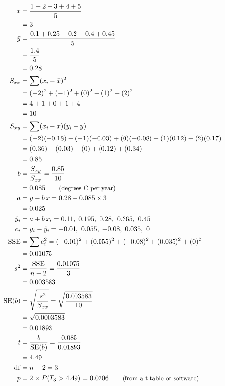 \begin{align*}
\bar{x} &= \frac{1 + 2 + 3 + 4 + 5}{5} \\
 &= 3 \\
\bar{y} &= \frac{0.1 + 0.25 + 0.2 + 0.4 + 0.45}{5} \\
 &= \frac{1.4}{5} \\
 &= 0.28 \\
S_{xx} &= \sum (x_i - \bar{x})^2 \\
 &= (-2)^2 + (-1)^2 + (0)^2 + (1)^2 + (2)^2 \\
 &= 4 + 1 + 0 + 1 + 4 \\
 &= 10 \\
S_{xy} &= \sum (x_i - \bar{x})(y_i - \bar{y}) \\
 &= (-2)(-0.18) + (-1)(-0.03) + (0)(-0.08) + (1)(0.12) + (2)(0.17) \\
 &= (0.36) + (0.03) + (0) + (0.12) + (0.34) \\
 &= 0.85 \\
b &= \frac{S_{xy}}{S_{xx}} = \frac{0.85}{10} \\
 &= 0.085 \qquad \text{\small (degrees C per year)} \\
a &= \bar{y} - b\,\bar{x} = 0.28 - 0.085 \times 3 \\
 &= 0.025 \\
\hat{y}_i &= a + b\,x_i = 0.11,\ 0.195,\ 0.28,\ 0.365,\ 0.45 \\
e_i &= y_i - \hat{y}_i = -0.01,\ 0.055,\ -0.08,\ 0.035,\ 0 \\
\mathrm{SSE} &= \sum e_i^2 = (-0.01)^2 + (0.055)^2 + (-0.08)^2 + (0.035)^2 + (0)^2 \\
 &= 0.01075 \\
s^2 &= \frac{\mathrm{SSE}}{n - 2} = \frac{0.01075}{3} \\
 &= 0.003583 \\
\mathrm{SE}(b) &= \sqrt{\frac{s^2}{S_{xx}}} = \sqrt{\frac{0.003583}{10}} \\
 &= \sqrt{0.0003583} \\
 &= 0.01893 \\
t &= \frac{b}{\mathrm{SE}(b)} = \frac{0.085}{0.01893} \\
 &= 4.49 \\
\mathrm{df} &= n - 2 = 3 \\
p &= 2 \times P(T_3 > 4.49) = 0.0206 \qquad \text{\small (from a t table or software)}
\end{align*}
